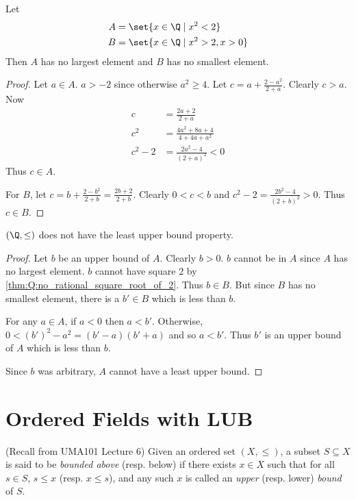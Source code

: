 \begin{theorem*} \label{thm:Q:root2_approximation}
    Let \begin{align*}
        A &= \set{x \in \Q \mid x^2 < 2} \\
        B &= \set{x \in \Q \mid x^2 > 2, x > 0}
    \end{align*}
    Then $A$ has no largest element and $B$ has no smallest element.
\end{theorem*}
\begin{proof}
    Let $a \in A$.
    $a > -2$ since otherwise $a^2 \ge 4$.
    Let $c = a + \frac{2 - a^2}{2 + a}$.
    Clearly $c > a$.
    Now \begin{align*}
        c      &= \frac{2a + 2}{2 + a} \\
        c^2     &= \frac{4a^2 + 8a + 4}{4 + 4a + a^2} \\
        c^2 - 2 &= \frac{2a^2 - 4}{(2 + a)^2} < 0
    \end{align*}
    Thus $c \in A$.

    For $B$, let $c = b + \frac{2 - b^2}{2 + b} = \frac{2b + 2}{2 + b}$.
    Clearly $0 < c < b$ and $c^2 - 2 = \frac{2b^2 - 4}{(2 + b)^2} > 0$.
    Thus $c \in B$.
\end{proof}

\begin{corollary*} \label{thm:Q:no_lub}
    $(\Q, \le)$ does not have the least upper bound property.
\end{corollary*}
\begin{proof}
    Let $b$ be an upper bound of $A$.
    Clearly $b > 0$.
    $b$ cannot be in $A$ since $A$ has no largest element.
    $b$ cannot have square $2$ by \cref{thm:Q:no_rational_square_root_of_2}.
    Thus $b \in B$.
    But since $B$ has no smallest element, there is a $b' \in B$ which is less
    than $b$.

    For any $a \in A$, if $a < 0$ then $a < b'$.
    Otherwise, $0 < (b')^2 - a^2 = (b' - a)(b' + a)$ and so $a < b'$.
    Thus $b'$ is an upper bound of $A$ which is less than $b$.

    Since $b$ was arbitrary, $A$ cannot have a least upper bound.
\end{proof}

\section{Ordered Fields with LUB} \label{sec:ordered_fields_with_lub}
(Recall from UMA101 Lecture 6)
Given an ordered set $(X, \le)$, a subset $S \subseteq X$ is said to be
\emph{bounded above} (resp. below) if there exists $x \in X$ such that for all
$s \in S$, $s \le x$ (resp. $x \le s$), and any such $x$ is called an
\emph{upper} (resp. lower) \emph{bound} of $S$.

